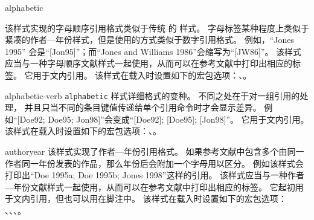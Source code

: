 \begin{marglist}
\item[alphabetic]

该样式实现的字母顺序引用格式类似于传统 \BibTeX 的  样式。
字母标签某种程度上类似于紧凑的作者---年份样式，但是使用的方式类似于数字引用格式。
例如，“Jones 1995” 会是“[Jon95]”；而“Jones and Williams 1986”会缩写为“[JW86]”。
该样式应当与一种字母顺序文献样式一起使用，从而可以在参考文献中打印出相应的标签。
它用于文内引用。
该样式在载入时设置如下的宏包选项：、。

\item[alphabetic-verb]
\texttt{alphabetic} 样式详细格式的变种。
不同之处在于对一组引用的处理，
并且只当不同的条目键值传递给单个引用命令时才会显示差异。
例如“[Doe92; Doe95; Jon98]”会变成“[Doe92]; [Doe95]; [Jon98]”。
它用于文内引用。
该样式在载入时设置如下的宏包选项：、。

\item[authoryear]
该样式实现了作者---年份引用格式。
如果参考文献中包含多个由同一作者同一年份发表的作品，那么年份后会附加一个字母用以区分。
例如该样式会打印出“Doe 1995a; Doe 1995b; Jones 1998”这样的引用。
该样式应当与一种作者---年份文献样式一起使用，从而可以在参考文献中打印出相应的标签。
它起初用于文内引用，但也可以用在脚注中。
该样式在载入时设置如下的宏包选项：
、、、。


\end{marglist}
